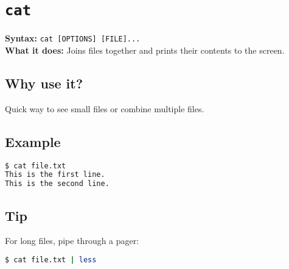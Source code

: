 \documentclass[10pt,oneside]{scrbook}
\begin{document}
\section{\texttt{cat}}
\begin{cmdbox}
  \textbf{Syntax:} \lstinline!cat [OPTIONS] [FILE]...! \\
  \textbf{What it does:} Joins files together and prints their contents to the screen.
\end{cmdbox}
\begin{commanddetails}
  \subsection*{Why use it?}
    Quick way to see small files or combine multiple files.

  \subsection*{Example}
  \begin{lstlisting}[language=bash]
$ cat file.txt
This is the first line.
This is the second line.
  \end{lstlisting}

  \subsection*{Tip}
  For long files, pipe through a pager:
  \begin{lstlisting}[language=bash]
$ cat file.txt | less
  \end{lstlisting}
\end{commanddetails}

\end{document}
